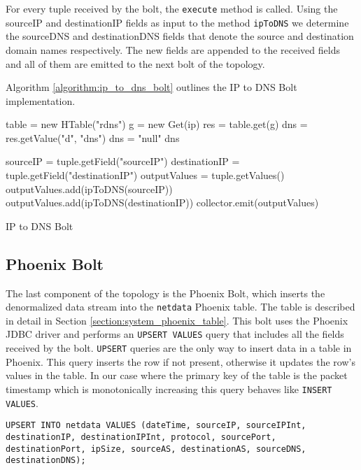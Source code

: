 For every tuple received by the bolt, the \texttt{execute} method is called. Using the sourceIP and destinationIP fields as input to the method \texttt{ipToDNS} we determine the sourceDNS and destinationDNS fields that denote the source and destination domain names respectively. The new fields are appended to the received fields and all of them are emitted to the next bolt of the topology.

Algorithm \ref{algorithm:ip_to_dns_bolt} outlines the IP to DNS Bolt implementation.

\begin{algorithm}[H]
\begin{algorithmic}[1]
\State table = new HTable("rdns")
\State g = new Get(ip)
\State res = table.get(g)
\State dns = res.getValue("d", "dns")
\State dns = "null"
\EndIf
\Return dns
\EndFunction

\State sourceIP = tuple.getField("sourceIP")
\State destinationIP = tuple.getField("destinationIP")
\State outputValues = tuple.getValues()
\State outputValues.add(ipToDNS(sourceIP))
\State outputValues.add(ipToDNS(destinationIP))
\State collector.emit(outputValues)
\EndFunction
\end{algorithmic}
\caption{IP to DNS Bolt}
\label{algorithm:ip_to_dns_bolt}
\end{algorithm}

\subsection{Phoenix Bolt}

The last component of the topology is the Phoenix Bolt, which inserts the denormalized data stream into the \texttt{netdata} Phoenix table. The table is described in detail in Section \ref{section:system_phoenix_table}. This bolt uses the Phoenix JDBC driver and performs an \texttt{UPSERT VALUES} query that includes all the fields received by the bolt. \texttt{UPSERT} queries are the only way to insert data in a table in Phoenix. This query inserts the row if not present, otherwise it updates the row's values in the table. In our case where the primary key of the table is the packet timestamp which is monotonically increasing this query behaves like \texttt{INSERT VALUES}.

\begin{lstlisting}[language=PhoenixSQL]
UPSERT INTO netdata VALUES (dateTime, sourceIP, sourceIPInt, destinationIP, destinationIPInt, protocol, sourcePort, destinationPort, ipSize, sourceAS, destinationAS, sourceDNS, destinationDNS);
\end{lstlisting}


